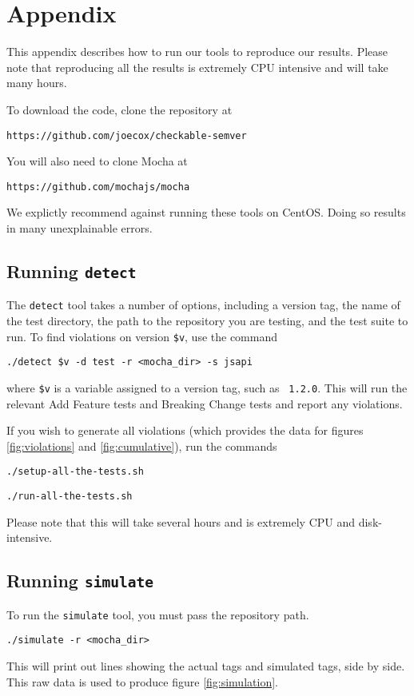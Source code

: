 \section{Appendix}
This appendix describes how to run our tools to reproduce our
results. Please note that reproducing all the results is extremely CPU
intensive and will take many hours.

To download the code, clone the repository at
\begin{center}
  {\tt https://github.com/joecox/checkable-semver}
\end{center}

You will also need to clone Mocha at
\begin{center}
  {\tt https://github.com/mochajs/mocha}
\end{center}

We explictly recommend against running these tools on CentOS. Doing so
results in many unexplainable errors.

\subsection{Running {\large {\tt detect}}}

The {\tt detect} tool takes a number of options, including a version
tag, the name of the test directory, the path to the repository you
are testing, and the test suite to run. To find violations on version
{\tt \$v}, use the command

\begin{center}
  {\tt ./detect \$v -d test -r <mocha\_dir> -s jsapi}
\end{center}
where {\tt \$v} is a variable assigned to a version tag, such as {\tt
  1.2.0}. This will run the relevant Add Feature tests and Breaking
Change tests and report any violations.

If you wish to generate all violations (which provides the data for
figures \ref{fig:violations} and \ref{fig:cumulative}), run the
commands

\begin{center}
  {\tt ./setup-all-the-tests.sh}
\end{center}
\begin{center}
  {\tt ./run-all-the-tests.sh}
\end{center}
Please note that this will take several hours and is extremely CPU
and disk-intensive.

\subsection{Running {\large {\tt simulate}}}

To run the {\tt simulate} tool, you must pass the repository path.

\begin{center}
  {\tt ./simulate -r <mocha\_dir>}
\end{center}
This will print out lines showing the actual tags and simulated tags,
side by side. This raw data is used to produce figure \ref{fig:simulation}.
